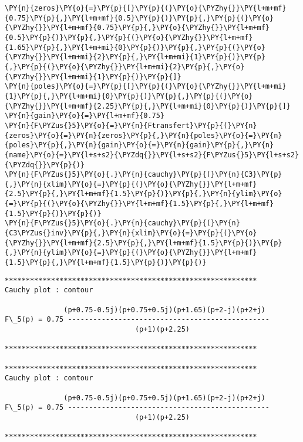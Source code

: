     \begin{tcolorbox}[breakable, size=fbox, boxrule=1pt, pad at break*=1mm,colback=cellbackground, colframe=cellborder]
\begin{Verbatim}[commandchars=\\\{\}]
\PY{n}{zeros}\PY{o}{=}\PY{p}{[}\PY{p}{(}\PY{o}{\PYZhy{}}\PY{l+m+mf}{0.75}\PY{p}{,}\PY{l+m+mf}{0.5}\PY{p}{)}\PY{p}{,}\PY{p}{(}\PY{o}{\PYZhy{}}\PY{l+m+mf}{0.75}\PY{p}{,}\PY{o}{\PYZhy{}}\PY{l+m+mf}{0.5}\PY{p}{)}\PY{p}{,}\PY{p}{(}\PY{o}{\PYZhy{}}\PY{l+m+mf}{1.65}\PY{p}{,}\PY{l+m+mi}{0}\PY{p}{)}\PY{p}{,}\PY{p}{(}\PY{o}{\PYZhy{}}\PY{l+m+mi}{2}\PY{p}{,}\PY{l+m+mi}{1}\PY{p}{)}\PY{p}{,}\PY{p}{(}\PY{o}{\PYZhy{}}\PY{l+m+mi}{2}\PY{p}{,}\PY{o}{\PYZhy{}}\PY{l+m+mi}{1}\PY{p}{)}\PY{p}{]}
\PY{n}{poles}\PY{o}{=}\PY{p}{[}\PY{p}{(}\PY{o}{\PYZhy{}}\PY{l+m+mi}{1}\PY{p}{,}\PY{l+m+mi}{0}\PY{p}{)}\PY{p}{,}\PY{p}{(}\PY{o}{\PYZhy{}}\PY{l+m+mf}{2.25}\PY{p}{,}\PY{l+m+mi}{0}\PY{p}{)}\PY{p}{]}
\PY{n}{gain}\PY{o}{=}\PY{l+m+mf}{0.75}
\PY{n}{F\PYZus{}5}\PY{o}{=}\PY{n}{Ftransfert}\PY{p}{(}\PY{n}{zeros}\PY{o}{=}\PY{n}{zeros}\PY{p}{,}\PY{n}{poles}\PY{o}{=}\PY{n}{poles}\PY{p}{,}\PY{n}{gain}\PY{o}{=}\PY{n}{gain}\PY{p}{,}\PY{n}{name}\PY{o}{=}\PY{l+s+s2}{\PYZdq{}}\PY{l+s+s2}{F\PYZus{}5}\PY{l+s+s2}{\PYZdq{}}\PY{p}{)}
\PY{n}{F\PYZus{}5}\PY{o}{.}\PY{n}{cauchy}\PY{p}{(}\PY{n}{C3}\PY{p}{,}\PY{n}{xlim}\PY{o}{=}\PY{p}{(}\PY{o}{\PYZhy{}}\PY{l+m+mf}{2.5}\PY{p}{,}\PY{l+m+mf}{1.5}\PY{p}{)}\PY{p}{,}\PY{n}{ylim}\PY{o}{=}\PY{p}{(}\PY{o}{\PYZhy{}}\PY{l+m+mf}{1.5}\PY{p}{,}\PY{l+m+mf}{1.5}\PY{p}{)}\PY{p}{)}
\PY{n}{F\PYZus{}5}\PY{o}{.}\PY{n}{cauchy}\PY{p}{(}\PY{n}{C3\PYZus{}inv}\PY{p}{,}\PY{n}{xlim}\PY{o}{=}\PY{p}{(}\PY{o}{\PYZhy{}}\PY{l+m+mf}{2.5}\PY{p}{,}\PY{l+m+mf}{1.5}\PY{p}{)}\PY{p}{,}\PY{n}{ylim}\PY{o}{=}\PY{p}{(}\PY{o}{\PYZhy{}}\PY{l+m+mf}{1.5}\PY{p}{,}\PY{l+m+mf}{1.5}\PY{p}{)}\PY{p}{)}
\end{Verbatim}
\end{tcolorbox}

    \begin{Verbatim}[commandchars=\\\{\}]
************************************************************
Cauchy plot : contour

              (p+0.75-0.5j)(p+0.75+0.5j)(p+1.65)(p+2-j)(p+2+j)
F\_5(p) = 0.75 ------------------------------------------------
                               (p+1)(p+2.25)

************************************************************

************************************************************
Cauchy plot : contour

              (p+0.75-0.5j)(p+0.75+0.5j)(p+1.65)(p+2-j)(p+2+j)
F\_5(p) = 0.75 ------------------------------------------------
                               (p+1)(p+2.25)

************************************************************

    \end{Verbatim}

